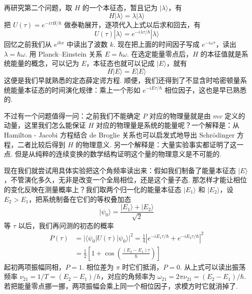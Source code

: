 ​再研究第二个问题，取 \(H\) 的一个本征态，暂且记为 \(|\lambda\rangle\)，有
\[
H|\lambda\rangle=\lambda|\lambda\rangle
\]
把 \(U(\tau)=e^{-i\tau H/\hbar}\) 做泰勒展开，逐项代入上式以后求和回去，有
\[
U(\tau)|\lambda\rangle=e^{-i\lambda\tau/\hbar}|\lambda\rangle
\]
回忆之前我们从 \(e^{ikx}\) 中读出了波数 \(k\). 现在把上面的时间因子写成 \(e^{-i\omega\tau}\)，读出 \(\lambda=\hbar\omega\). 用 Planck–Einstein 关系 \(E=\hbar\omega\). 在选定能量零点后，\(H\) 的本征值就是系统能量的概念，可以记为 \(E\)，本征态也就可以记成 \(|E\rangle\)，就有
\[
H|E\rangle=E|E\rangle
\]
这便是我们早就熟悉的定态薛定谔方程. 顺便，我们还得到了不显含时哈密顿量系统能量本征态的时间演化规律：乘上一个形如 \(e^{-iE\tau/\hbar}\) 相位因子，这也是早已熟悉的. 

不过有一个问题值得一问：之前我们不能确定 \(P\) 对应的物理量就是由 \(mv\) 定义的动量，这里我们怎么能保证 \(H\) 对应的物理量是系统的能量呢？一个解释是：从 Hamilton - Jacobi 方程结合 de Broglie 关系也可以启发式地导出 Schrödinger 方程，二者比较后得到 $H$ 的物理意义. 另一个解释是：大量实验事实都证明了这一点. 但是从纯粹的连续变换的数学结构证明这个量的物理意义是不可能的.

现在我们就尝试用具体实验把这个角频率读出来：假如我们制备了能量本征态 \(|E\rangle\)，不管演化多久，无非是改变一个全局相位，还是这个量子态. 那怎样才能让相位的变化反映在测量概率上？我们取两个归一化的能量本征态 \(|E_1\rangle\) 和 \(|E_2\rangle\)，设 \(E_2>E_1\)，把系统制备在它们的等权叠加态
\[
|\psi_0\rangle=\frac{|E_1\rangle+|E_2\rangle}{\sqrt{2}}
\]
等 \(\tau\) 以后，我们再问测的初态的概率
\[
\begin{aligned}
P(\tau)&=\big|\langle\psi_0|U(\tau)|\psi_0\rangle\big|^2
=\frac14\left|e^{-iE_1\tau/\hbar}+e^{-iE_2\tau/\hbar}\right|^2\\
&=\frac12\left[1+\cos\left(\frac{(E_2-E_1)\tau}{\hbar}\right)\right]
\end{aligned}
\]
起初两项振幅同相，\(P=1\). 相位差为 \(\pi\) 时它们抵消，\(P=0\). 从上式可以读出振荡频率 \(\nu_{21}=1/T=(E_2-E_1)/h\)，对应的角频率为 \(\omega_{21}=2\pi\nu_{21}=(E_2-E_1)/\hbar\). 若把能量零点挪一挪，两项振幅会乘上同一个相位因子，求模方时它就消掉了.

\begin{center}

\end{center}

